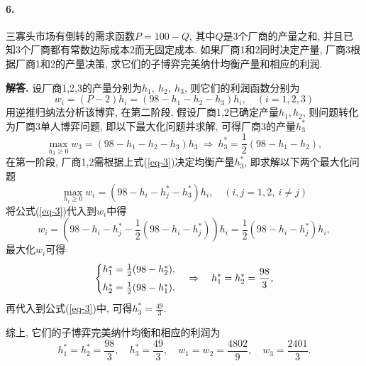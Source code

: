 \documentclass[12pt, a4paper, oneside]{ctexart}
\newenvironment{solution}{\par\noindent\textbf{解答. }}{\bigskip\par}
\let\geq=\geqslant %
\def\add{\vspace{1ex}}  %
\def\del{\vspace{-3.5ex}}  %
\begin{document}
\paragraph{6.}三寡头市场有倒转的需求函数$P = 100-Q$, 其中$Q$是$3$个厂商的产量之和, 并且已知$3$个厂商都有常数边际成本$2$而无固定成本. 如果厂商1和2同时决定产量, 厂商3根据厂商1和2的产量决策, 求它们的子博弈完美纳什均衡产量和相应的利润.
\begin{solution}
    设厂商1,2,3的产量分别为$h_1,\ h_2,\ h_3$, 则它们的利润函数分别为
    \begin{equation}\label{eq-w}
        w_i = (P-2)h_i = (98 - h_1-h_2-h_3)h_i,\quad(i = 1, 2, 3)
    \end{equation}
    用逆推归纳法分析该博弈, 在第二阶段, 假设厂商1,2已确定产量$h_1,h_2$, 则问题转化为厂商3单人博弈问题, 即以下最大化问题并求解, 可得厂商3的产量$h_3^*$
    \begin{equation}\label{eq-3}
        \max_{h_3\geq 0}w_3 = (98 - h_1-h_2-h_3)h_3\ \Rightarrow\ h_3^* = \frac{1}{2}(98 - h_1 - h_2),
    \end{equation}
    在第一阶段, 厂商1,2需根据上式(\ref{eq-3})决定均衡产量$h_3^*$, 即求解以下两个最大化问题
    \begin{equation}
        \max_{h_i\geq 0}w_i = (98 - h_i-h_j^* - h_3^*)h_i,\quad(i, j = 1, 2,\  i\neq j)
    \end{equation}
    将公式(\ref{eq-3})代入到$w_i$中得
    \begin{equation*}
        w_i = (98 - h_i - h_j^* -\frac{1}{2}(98-h_i-h_j^*))h_i = \frac{1}{2}(98-h_i-h_j^*)h_i,
    \end{equation*}
    最大化$w_i$可得
    \begin{equation*}
        \begin{cases}
            h_1^* = \frac{1}{2}(98 - h_2^*),\add\\
            h_2^* = \frac{1}{2}(98 - h_1^*).
        \end{cases}\Rightarrow\quad h_1^* = h_2^* = \frac{98}{3},
    \end{equation*}
    再代入到公式(\ref{eq-3})中, 可得$h_3^* = \frac{49}{3}$.\add
    
    综上, 它们的子博弈完美纳什均衡和相应的利润为
    \begin{equation*}
            h_1^* = h_2^* = \frac{98}{3},\quad h_3^* = \frac{49}{3},\quad
            w_1=w_2=\frac{4802}{9},\quad w_3 = \frac{2401}{3}.
    \end{equation*}
\end{solution}\del\del
\end{document}
